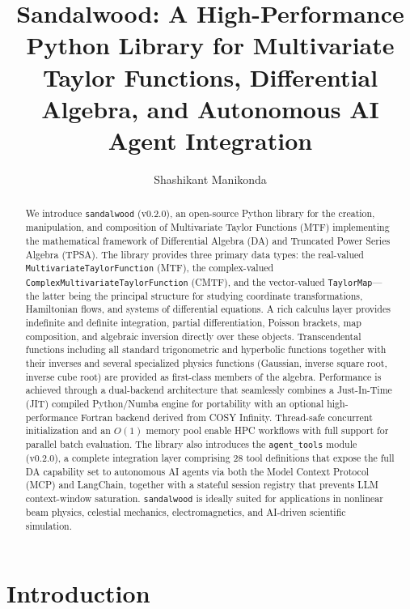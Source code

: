 \documentclass[aps,prb,reprint,superscriptaddress,nofootinbib]{revtex4-2}
\begin{document}
\title{Sandalwood: A High-Performance Python Library for Multivariate Taylor Functions, Differential Algebra, and Autonomous AI Agent Integration}

\author{Shashikant Manikonda}

\begin{abstract}
We introduce \texttt{sandalwood} (v0.2.0), an open-source Python library for the creation, manipulation, and composition of Multivariate Taylor Functions (MTF) implementing the mathematical framework of Differential Algebra (DA) and Truncated Power Series Algebra (TPSA). The library provides three primary data types: the real-valued \texttt{MultivariateTaylorFunction} (MTF), the complex-valued \texttt{ComplexMultivariateTaylorFunction} (CMTF), and the vector-valued \texttt{TaylorMap}---the latter being the principal structure for studying coordinate transformations, Hamiltonian flows, and systems of differential equations. A rich calculus layer provides indefinite and definite integration, partial differentiation, Poisson brackets, map composition, and algebraic inversion directly over these objects. Transcendental functions including all standard trigonometric and hyperbolic functions together with their inverses and several specialized physics functions (Gaussian, inverse square root, inverse cube root) are provided as first-class members of the algebra. Performance is achieved through a dual-backend architecture that seamlessly combines a Just-In-Time (JIT) compiled Python/Numba engine for portability with an optional high-performance Fortran backend derived from COSY Infinity. Thread-safe concurrent initialization and an $O(1)$ memory pool enable HPC workflows with full support for parallel batch evaluation. The library also introduces the \texttt{agent\_tools} module (v0.2.0), a complete integration layer comprising 28 tool definitions that expose the full DA capability set to autonomous AI agents via both the Model Context Protocol (MCP) and LangChain, together with a stateful session registry that prevents LLM context-window saturation. \texttt{sandalwood} is ideally suited for applications in nonlinear beam physics, celestial mechanics, electromagnetics, and AI-driven scientific simulation.
\end{abstract}

\maketitle

\section{Introduction}
\label{sec:intro}
\end{document}
